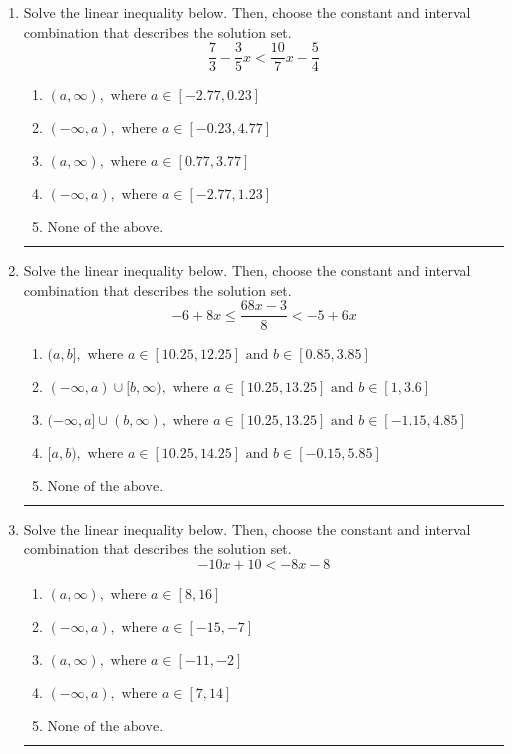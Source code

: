 \documentclass[14pt]{extbook}
\newcommand{\litem}[1]{\item#1\hspace*{-1cm}\rule{\textwidth}{0.4pt}}
\begin{document}
\begin{enumerate}
{\begin{enumerate}[label=\Alph*.]
\end{enumerate} }
\litem{
Solve the linear inequality below. Then, choose the constant and interval combination that describes the solution set.\[ \frac{7}{3} - \frac{3}{5} x < \frac{10}{7} x - \frac{5}{4} \]\begin{enumerate}[label=\Alph*.]
\item \( (a, \infty), \text{ where } a \in [-2.77, 0.23] \)
\item \( (-\infty, a), \text{ where } a \in [-0.23, 4.77] \)
\item \( (a, \infty), \text{ where } a \in [0.77, 3.77] \)
\item \( (-\infty, a), \text{ where } a \in [-2.77, 1.23] \)
\item \( \text{None of the above}. \)

\end{enumerate} }
\litem{
Solve the linear inequality below. Then, choose the constant and interval combination that describes the solution set.\[ -6 + 8 x \leq \frac{68 x - 3}{8} < -5 + 6 x \]\begin{enumerate}[label=\Alph*.]
\item \( (a, b], \text{ where } a \in [10.25, 12.25] \text{ and } b \in [0.85, 3.85] \)
\item \( (-\infty, a) \cup [b, \infty), \text{ where } a \in [10.25, 13.25] \text{ and } b \in [1, 3.6] \)
\item \( (-\infty, a] \cup (b, \infty), \text{ where } a \in [10.25, 13.25] \text{ and } b \in [-1.15, 4.85] \)
\item \( [a, b), \text{ where } a \in [10.25, 14.25] \text{ and } b \in [-0.15, 5.85] \)
\item \( \text{None of the above.} \)

\end{enumerate} }
\litem{
Solve the linear inequality below. Then, choose the constant and interval combination that describes the solution set.\[ -10x + 10 < -8x -8 \]\begin{enumerate}[label=\Alph*.]
\item \( (a, \infty), \text{ where } a \in [8, 16] \)
\item \( (-\infty, a), \text{ where } a \in [-15, -7] \)
\item \( (a, \infty), \text{ where } a \in [-11, -2] \)
\item \( (-\infty, a), \text{ where } a \in [7, 14] \)
\item \( \text{None of the above}. \)


\end{enumerate}}
\end{enumerate}
\end{document}
